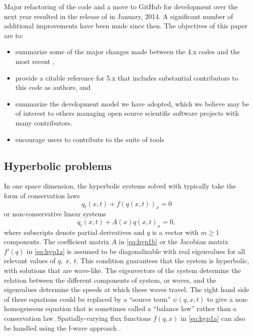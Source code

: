 Major refactoring of the code and a move to GitHub for development over the
next year resulted in the release of  in January, 2014.
A significant number of additional improvements have been made since then.  The
objectives of this paper are to:
\begin{itemize}
\item summarize some of the major changes made between the \clawpack
4.x codes and the most recent ,
\item provide a citable reference for \clawpack 5.x that includes
substantial contributors to this code as authors, and
\item summarize the development model we have adopted, which we believe
may be of interest to others managing open source scientific software
projects with many contributors.
\item encourage users to contribute to the \clawpack suite of tools
\end{itemize}

\subsection{Hyperbolic problems}\label{sec:hyp}

In one space dimension, the hyperbolic systems solved with
\clawpack typically take the form of conservation laws
\begin{equation}\label{eq:hyp1a}
q_t(x,t) + f(q(x,t))_x = 0
\end{equation}
or non-conservative linear systems
\begin{equation}\label{eq:hyp1b}
q_t(x,t) + A(x) q(x,t)_x = 0,
\end{equation}
where subscripts denote partial derivatives and $q$ is a vector with
$m\ge 1$ components.  The coefficient matrix $A$ in \cref{eq:hyp1b} or
the Jacobian matrix $f'(q)$ in \cref{eq:hyp1a} is assumed to be
diagonalizable with real eigenvalues for all relevant values of
$q,~x,~t$.  This condition guarantees that the system is hyperbolic,
with solutions that are wave-like.  The eigenvectors of the system
determine the relation between the different components
of system, or waves, and the eigenvalues determine the speeds at which these
waves travel.  The right hand side of these equations could be
replaced by a ``source term'' $\psi(q,x,t)$ to give a non-homogeneous
equation that is sometimes called a ``balance law'' rather than a
conservation law.  Spatially-varying flux functions $f(q,x)$ in
\cref{eq:hyp1a} can also be handled using the f-wave approach
\cite{db-rjl-sm-jr:vcflux}.

